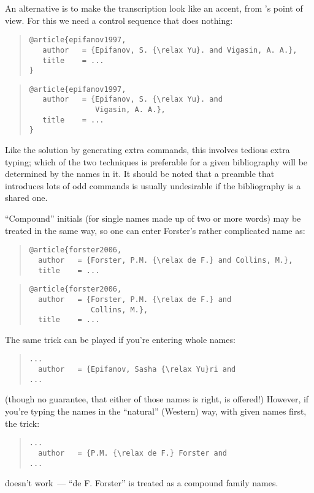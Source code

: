 An alternative is to make the transcription look like an accent, from
\BibTeX{}'s point of view.  For this we need a control sequence that
does nothing:
\begin{wideversion}
\begin{quote}
\begin{verbatim}
@article{epifanov1997,
   author   = {Epifanov, S. {\relax Yu}. and Vigasin, A. A.},
   title    = ...
}
\end{verbatim}
\end{quote}
\end{wideversion}
\begin{narrowversion}
\begin{quote}
\begin{verbatim}
@article{epifanov1997,
   author   = {Epifanov, S. {\relax Yu}. and
               Vigasin, A. A.},
   title    = ...
}
\end{verbatim}
\end{quote}
\end{narrowversion}
Like the solution by generating extra commands, this involves tedious
extra typing; which of the two techniques is preferable for a given
bibliography will be determined by the names in it.  It should be
noted that a preamble that introduces lots of odd commands is usually
undesirable if the bibliography is a shared one.

``Compound'' initials (for single names made up of two or more words)
may be treated in the same way, so one can enter Forster's rather
complicated name as:
\begin{wideversion}
\begin{quote}
\begin{verbatim}
@article{forster2006,
  author   = {Forster, P.M. {\relax de F.} and Collins, M.},
  title    = ...
\end{verbatim}
\end{quote}
\end{wideversion}
\begin{narrowversion}
\begin{quote}
\begin{verbatim}
@article{forster2006,
  author   = {Forster, P.M. {\relax de F.} and
              Collins, M.},
  title    = ...
\end{verbatim}
\end{quote}
\end{narrowversion}
The same trick can be played if you're entering whole names:
\begin{quote}
\begin{verbatim}
...
  author   = {Epifanov, Sasha {\relax Yu}ri and
...
\end{verbatim}
\end{quote}
(though no guarantee, that either of those names is right, is
offered!)
However, if you're typing the names in the ``natural'' (Western) way,
with given names first, the trick:
\begin{quote}
\begin{verbatim}
...
  author   = {P.M. {\relax de F.} Forster and
...
\end{verbatim}
\end{quote}
doesn't work~--- ``de F. Forster'' is treated as a compound family
names.


